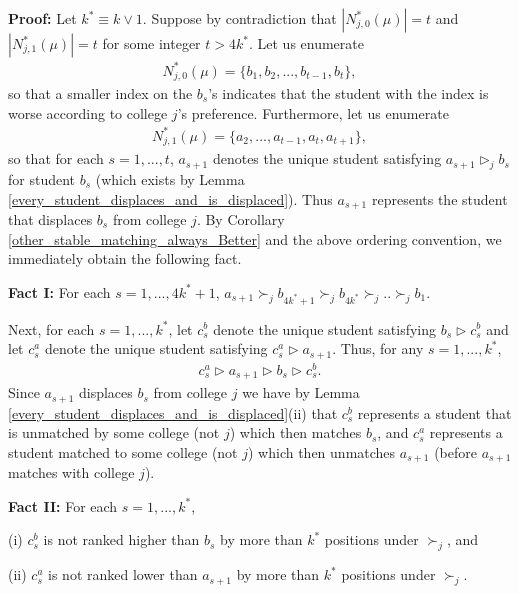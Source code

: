 \documentclass[12pt, fullpage]{amsart}
\theoremstyle{definition}
\theoremstyle{definition}
\theoremstyle{definition}
\begin{document}
\begin{bibunit}[econometrica]
\noindent \textbf{Proof: } Let $k^{*}\equiv k\vee 1$. Suppose by contradiction that $|N^{*}_{j,0}(\mu)|= t$ and $|N^{*}_{j,1}(\mu)|= t$ for some integer $t>4k^{*}$. Let us enumerate
\begin{align*}
	N^{*}_{j,0}(\mu) = \{b_{1},b_{2},...,b_{t-1},b_{t}\},
\end{align*}
so that a smaller index on the $b_{s}$'s indicates that the student with the index is worse according to college $j$'s preference. Furthermore, let us enumerate 
\begin{align*}
	N^{*}_{j,1}(\mu) = \{a_{2},...,a_{t-1},a_{t},a_{t+1}\},
\end{align*}
so that for each $s=1,...,t$, $a_{s+1}$ denotes the unique student  satisfying $a_{s+1}\vartriangleright_{j}b_{s}$ for student $b_{s}$ (which exists by Lemma  \ref{every_student_displaces_and_is_displaced}). Thus $a_{s+1}$ represents the student that displaces $b_{s}$ from college $j$. By Corollary \ref{other_stable_matching_always_Better} and the above ordering convention, we immediately obtain the following fact. \medskip 

\noindent \textbf{Fact I: } For each $s=1,...,4k^{*}+1$, $a_{s+1}\succ_{j}b_{4k^{*}+1}\succ_{j}b_{4k^{*}}\succ_{j}..\succ_{j}b_{1}$. \medskip 

Next, for each $s=1,...,k^{*}$,  let $c_{s}^{b}$ denote the unique student satisfying $b_{s}\vartriangleright c_{s}^{b} $  and let $c_{s}^{a}$ denote the unique student satisfying $c_{s}^{a}\vartriangleright a_{s+1}$. Thus, for any $s=1,...,k^{*}$,
\begin{align}\label{displacement_ordering_s}
	c_{s}^{a}\vartriangleright a_{s+1}\vartriangleright b_{s}\vartriangleright 	c_{s}^{b}.
\end{align}
Since $a_{s+1}$ displaces $b_{s}$ from college $j$ we have by Lemma \ref{every_student_displaces_and_is_displaced}(ii) that $c_{s}^{b}$ represents a student that is unmatched by some college (not $j$)  which then matches $b_{s}$, and $c_{s}^{a}$ represents a student matched to some college (not $j$) which then unmatches $a_{s+1}$ (before $a_{s+1}$ matches with college $j$).\medskip 

\noindent \textbf{Fact II: } For each $s=1,...,k^{*}$,

(i) $c_{s}^b$ is not ranked higher than $b_{s}$ by more than $k^{*}$ positions under $\succ_{j}$, and

(ii) $c_{s}^a$ is not ranked lower than $a_{s+1}$ by more than $k^{*}$ positions under $\succ_{j}$.\medskip


\end{bibunit}
\end{document}
